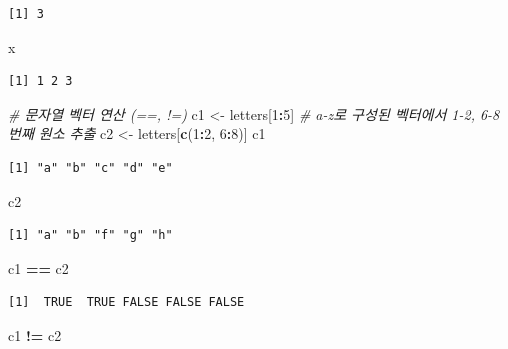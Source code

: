 \documentclass[
  11pt,
]{krantz}
\newenvironment{Shaded}{\begin{snugshade}}{\end{snugshade}}
\newcommand{\CommentTok}[1]{\textcolor[rgb]{0.37,0.37,0.37}{\textit{#1}}}
\newcommand{\DecValTok}[1]{\textcolor[rgb]{0.06,0.06,0.06}{#1}}
\newcommand{\KeywordTok}[1]{\textcolor[rgb]{0.27,0.27,0.27}{\textbf{#1}}}
\newcommand{\NormalTok}[1]{#1}
\newcommand{\OperatorTok}[1]{\textcolor[rgb]{0.43,0.43,0.43}{\textbf{#1}}}
\newcommand{\StringTok}[1]{\textcolor[rgb]{0.5,0.5,0.5}{#1}}
\begin{document}
\begin{verbatim}
[1] 3
\end{verbatim}

\begin{Shaded}
\begin{Highlighting}[]
\NormalTok{x}
\end{Highlighting}
\end{Shaded}

\begin{verbatim}
[1] 1 2 3
\end{verbatim}

\begin{Shaded}
\begin{Highlighting}[]
\CommentTok{# 문자열 벡터 연산 (==, !=)}
\NormalTok{c1 <-}\StringTok{ }\NormalTok{letters[}\DecValTok{1}\OperatorTok{:}\DecValTok{5}\NormalTok{]}
\CommentTok{# a-z로 구성된 벡터에서 1-2, 6-8 번째 원소 추출}
\NormalTok{c2 <-}\StringTok{ }\NormalTok{letters[}\KeywordTok{c}\NormalTok{(}\DecValTok{1}\OperatorTok{:}\DecValTok{2}\NormalTok{, }\DecValTok{6}\OperatorTok{:}\DecValTok{8}\NormalTok{)] }
\NormalTok{c1}
\end{Highlighting}
\end{Shaded}

\begin{verbatim}
[1] "a" "b" "c" "d" "e"
\end{verbatim}

\begin{Shaded}
\begin{Highlighting}[]
\NormalTok{c2}
\end{Highlighting}
\end{Shaded}

\begin{verbatim}
[1] "a" "b" "f" "g" "h"
\end{verbatim}

\begin{Shaded}
\begin{Highlighting}[]
\NormalTok{c1 }\OperatorTok{==}\StringTok{ }\NormalTok{c2}
\end{Highlighting}
\end{Shaded}

\begin{verbatim}
[1]  TRUE  TRUE FALSE FALSE FALSE
\end{verbatim}

\begin{Shaded}
\begin{Highlighting}[]
\NormalTok{c1 }\OperatorTok{!=}\StringTok{ }\NormalTok{c2}
\end{Highlighting}
\end{Shaded}
\end{document}
